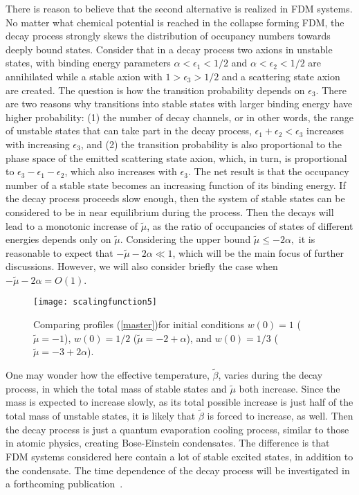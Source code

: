 \documentclass[aps,prl,twocolumn]{revtex4}
\begin{document}
There is reason to believe that the second alternative is realized in FDM systems.  No matter what chemical potential is reached in the collapse forming FDM, the decay process strongly skews the distribution of occupancy numbers towards deeply bound states. Consider that in a decay process two axions in unstable states, with binding energy parameters $\alpha<\epsilon_1<1/2$ and $\alpha<\epsilon_2<1/2$ are annihilated while a stable axion with $1>\epsilon_3>1/2$ and a scattering state axion are created.  The question is how the transition probability depends on $\epsilon_3$. There are two reasons why transitions into stable states with larger binding energy have higher probability: (1) the  number of decay channels, or in other words, the range of unstable states that can take part in the decay process, $\epsilon_1+\epsilon_2 <\epsilon_3$  increases with increasing $\epsilon_3$, and (2) the transition probability is also proportional to the phase space of the emitted scattering state axion, which, in turn, is proportional to $\epsilon_3-\epsilon_1-\epsilon_2$, which also increases with $\epsilon_3$.  The net result is that the occupancy number of a stable state becomes an increasing function of its binding energy.   If the decay process proceeds slow enough, then the system of stable states can be considered to  be in near equilibrium during the process.  Then the decays will lead to a monotonic increase of $\tilde\mu$, as the ratio of occupancies of states of different energies depends only on $\tilde\mu$.  Considering the upper bound
$\tilde\mu\leq-2\alpha,$ it is reasonable to expect that $-\tilde\mu-2\alpha\ll1$, which will be the main focus of further discussions.  However, we will also consider briefly the case when $-\tilde\mu-2\alpha=O(1)$.
\begin{figure}[b]
\texttt{[image: scalingfunction5]}
\caption{\label{v0values}Comparing  profiles (\ref{master})for initial conditions $w(0)=1$ ($\tilde\mu=-1$), $w(0)=1/2$ ($\tilde\mu=-2+\alpha$), and $w(0)=1/3$ ($\tilde\mu=-3+2\alpha$).}
\end{figure}

One may wonder how the effective temperature, $\tilde\beta$, varies during the decay process, in which the total mass of stable states and $\tilde\mu$ both increase. Since the mass is expected to increase slowly, as its total possible increase is just half of the total mass of unstable states, it is likely that $\tilde\beta$ is forced to increase, as well.  Then the decay process is just a quantum evaporation cooling process, similar to those in atomic physics, creating Bose-Einstein condensates. The difference is that FDM systems considered here contain a lot of stable excited states, in addition to the condensate. The time dependence of the decay process will be investigated in a forthcoming publication~\cite{SSW}.
\end{document}
